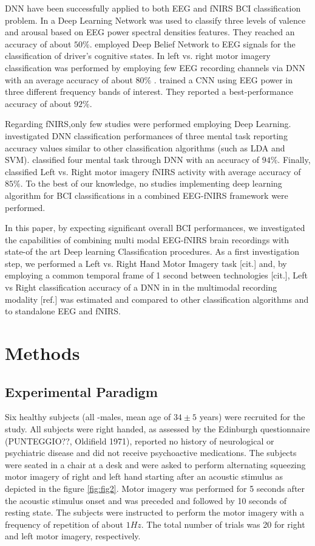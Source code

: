 \documentclass[12pt ]{iopart}
\begin{document}
DNN have been successfully applied to  both EEG and fNIRS BCI classification problem. In \textcite{jirayucharoensak2014eeg} a Deep Learning Network was used to classify three levels of valence and arousal based on EEG power spectral densities  features. They reached an accuracy of about $50\%$. 
\textcite{hajinoroozi2015feature} employed Deep Belief Network to EEG signals for the classification of driver's cognitive states. 
In \textcite{an2014deep} left vs. right motor imagery classification  was performed by employing few EEG recording channels via DNN with an average accuracy of about $80\%$ . 
 \textcite{bashivan2015learning} trained a CNN using EEG power in three different frequency bands of interest. They reported a best-performance accuracy of about $92\%$.

Regarding fNIRS,only  few  studies were performed employing Deep Learning.  \textcite{hennrich2015investigating} investigated DNN classification performances of three mental task reporting accuracy values similar  to other classification algorithms (such as LDA and SVM).  \textcite{abibullaev2011neural} classified four mental task through DNN with an accuracy of $94\%$. Finally, \textcite{nguyen2013temporal} classified Left vs. Right motor imagery fNIRS activity with average accuracy of $85\%$. To the best of our knowledge, no studies implementing deep learning algorithm for BCI classifications  in a combined EEG-fNIRS framework were performed.

 In this paper, by expecting significant overall BCI performances,  we investigated the capabilities of combining multi modal EEG-fNIRS brain recordings  with state-of the art Deep learning Classification procedures. As a first investigation step, we performed a Left vs. Right Hand Motor Imagery task [cit.] and, by employing a common temporal frame of 1 second between technologies [cit.], Left vs Right classification accuracy of a DNN in in the multimodal recording modality  [ref.] was estimated and compared to other classification algorithms and to standalone EEG and fNIRS. 


\section{Methods}
\subsection{Experimental Paradigm}
Six healthy subjects (all -males, mean age of $34 \pm 5$ years) were recruited for the study. All subjects were right handed, as assessed by the Edinburgh questionnaire (PUNTEGGIO??, Oldifield 1971), reported no history of neurological or psychiatric disease and did not receive psychoactive medications. 
The subjects were seated in a chair at a desk and were asked to perform alternating squeezing motor imagery of right and left hand starting after an acoustic stimulus as depicted in the figure \ref{fig:fig2}. Motor imagery was performed for 5 seconds after the acoustic stimulus onset and was preceded and followed by 10 seconds of resting state. The subjects were instructed to perform the motor imagery with a frequency of repetition of about $1Hz$. The total number of trials was 20 for right and left motor imagery, respectively. 
\end{document}
